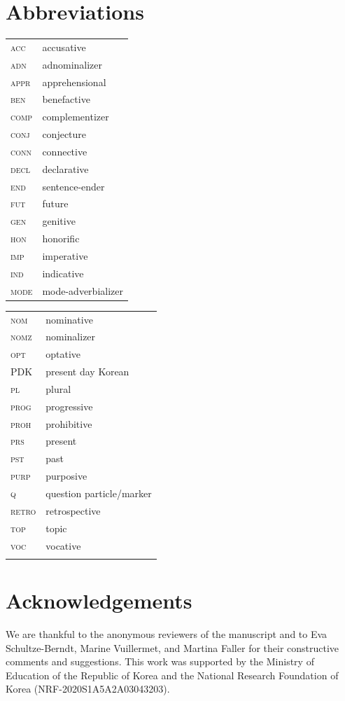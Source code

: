 \documentclass[output=paper,colorlinks,citecolor=brown]{langscibook}
\begin{document}
\section*{Abbreviations}
\begin{tabularx}{.5\textwidth}{@{}lQ@{}}
\textsc{acc} & accusative \\
\textsc{adn} & adnominalizer \\
\textsc{appr} & apprehensional \\
\textsc{ben} & benefactive \\
\textsc{comp} & complementizer \\
\textsc{conj} & conjecture \\
\textsc{conn} & connective \\
\textsc{decl} & declarative \\
\textsc{end} & sentence-ender \\
\textsc{fut} & future \\
\textsc{gen} & genitive \\
\textsc{hon} & honorific \\
\textsc{imp} & imperative \\
\textsc{ind} & indicative \\
\textsc{mode} & mode-adverbializer\end{tabularx}%
\begin{tabularx}{.5\textwidth}{@{}lQ@{}}
\textsc{nom} & nominative \\
\textsc{nomz} & nominalizer \\
\textsc{opt} & optative \\
PDK & present day Korean \\
\textsc{pl} & plural \\
\textsc{prog} & progressive \\
\textsc{proh} & prohibitive \\
\textsc{prs} & present\\
\textsc{pst} & past \\
\textsc{purp} & purposive \\
\textsc{q} & question particle/marker \\
\textsc{retro} & retrospective \\
\textsc{top} & topic \\
\textsc{voc} & vocative \\\\
\end{tabularx}

\section*{Acknowledgements}
We are thankful to the anonymous reviewers of the manuscript and to Eva Schultze-Berndt, Marine Vuillermet, and Martina Faller for their constructive comments and suggestions. This work was supported by the Ministry of Education of the Republic of Korea and the National Research Foundation of Korea (NRF-2020S1A5A2A03043203).




\printbibliography[heading=subbibliography,notkeyword=this]
\end{document}
